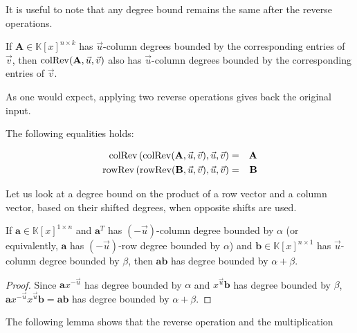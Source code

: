 It is useful to note that any degree bound remains the same after
the reverse operations.
\begin{lem}
If $\mathbf{A}\in\mathbb{K}\left[x\right]^{n\times k}$ has $\vec{u}$-column
degrees bounded by the corresponding entries of $\vec{v}$, then $\operatorname{colRev}(\mathbf{A},\vec{u},\vec{v})$
also has $\vec{u}$-column degrees bounded by the corresponding entries
of $\vec{v}$.
\end{lem}
As one would expect, applying two reverse operations gives back the
original input.
\begin{lem}
The following equalities holds:%
\begin{comment}
\begin{eqnarray*}
\rev\left(\rev(p,u),u\right) & = & p\\
\colRev\left(\colRev(\mathbf{a},\vec{u},v),\vec{u},v\right) & = & \mathbf{a}\\
\rowRev\left(\rowRev(\mathbf{b},\vec{u},v),\vec{u},v\right) & = & \mathbf{b}
\end{eqnarray*}
\end{comment}
\begin{eqnarray*}
\operatorname{colRev}\left(\operatorname{colRev}(\mathbf{A},\vec{u},\vec{v}),\vec{u},\vec{v}\right) & = & \mathbf{A}\\
\operatorname{rowRev}\left(\operatorname{rowRev}(\mathbf{B},\vec{u},\vec{v}),\vec{u},\vec{v}\right) & = & \mathbf{B}
\end{eqnarray*}

\end{lem}
Let us look at a degree bound on the product of a row vector and a
column vector, based on their shifted degrees, when opposite shifts
are used.
\begin{lem}
\label{lem:vectorProductBound}If $\mathbf{a}\in\mathbb{K}\left[x\right]^{1\times n}$
and $\mathbf{a}^{T}$ has $\left(-\vec{u}\right)$-column degree bounded
by $\alpha$ (or equivalently, $\mathbf{a}$ has $\left(-\vec{u}\right)$-row
degree bounded by $\alpha$) and $\mathbf{b}\in\mathbb{K}\left[x\right]^{n\times1}$
has $\vec{u}$-column degree bounded by $\beta$, then $\mathbf{a}\mathbf{b}$
has degree bounded by $\alpha+\beta$.\end{lem}
\begin{proof}
Since $\mathbf{a}x^{-\vec{u}}$ has degree bounded by $\alpha$ and
$x^{\vec{u}}\mathbf{b}$ has degree bounded by $\beta$, $\mathbf{a}x^{-\vec{u}}x^{\vec{u}}\mathbf{b}=\mathbf{a}\mathbf{b}$
has degree bounded by $\alpha+\beta$.
\end{proof}
The following lemma shows that the reverse operation and the multiplication
